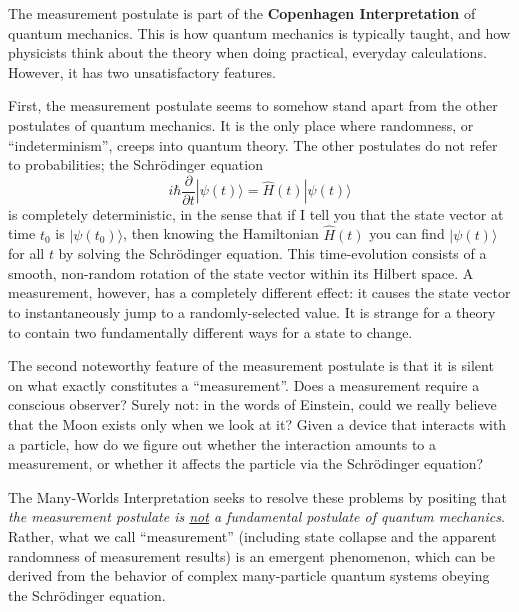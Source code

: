 \documentclass[pra,11pt]{revtex4}
\begin{document}
The measurement postulate is part of the \textbf{Copenhagen
  Interpretation} of quantum mechanics.  This is how quantum mechanics
is typically taught, and how physicists think about the theory when
doing practical, everyday calculations.  However, it has two
unsatisfactory features.

First, the measurement postulate seems to somehow stand apart from the
other postulates of quantum mechanics.  It is the only place where
randomness, or ``indeterminism'', creeps into quantum theory.  The
other postulates do not refer to probabilities; the Schr\"odinger
equation
$$i\hbar\frac{\partial}{\partial t}|\psi(t)\rangle = \hat{H}(t) |\psi(t)\rangle$$
is completely deterministic, in the sense that if I tell you that the
state vector at time $t_0$ is $|\psi(t_0)\rangle$, then knowing the
Hamiltonian $\hat{H}(t)$ you can find $|\psi(t)\rangle$ for all $t$ by
solving the Schr\"odinger equation.  This time-evolution consists of a
smooth, non-random rotation of the state vector within its Hilbert
space.  A measurement, however, has a completely different effect: it
causes the state vector to instantaneously jump to a randomly-selected
value.  It is strange for a theory to contain two fundamentally
different ways for a state to change.

The second noteworthy feature of the measurement postulate is that it
is silent on what exactly constitutes a ``measurement''.  Does a
measurement require a conscious observer?  Surely not: in the words of
Einstein, could we really believe that the Moon exists only when we
look at it?  Given a device that interacts with a particle, how do we
figure out whether the interaction amounts to a measurement, or
whether it affects the particle via the Schr\"odinger equation?

The Many-Worlds Interpretation seeks to resolve these problems by
positing that \textit{the measurement postulate is \underline{not} a
  fundamental postulate of quantum mechanics}.  Rather, what we call
``measurement'' (including state collapse and the apparent randomness
of measurement results) is an emergent phenomenon, which can be
derived from the behavior of complex many-particle quantum systems
obeying the Schr\"odinger equation.
\end{document}
